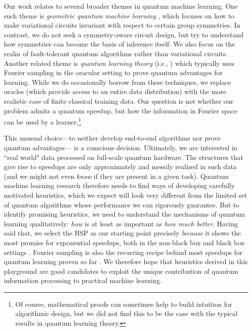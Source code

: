 \documentclass[aps, pre,reprint,nofootinbib,citeautoscript,floatfix]{revtex4-1}
\begin{document}
Our work relates to several 
broader themes in quantum machine learning. One such theme is \textit{geometric quantum machine learning} \cite{Meyer_2023, GIQML, bronstein2021geometric}, which focuses on how to make variational circuits invariant with respect to certain group symmetries. In contrast, we do not seek a symmetry-aware circuit design, but try to understand how symmetries can become the basis of inference itself. We also focus on the realm of fault-tolerant quantum algorithms rather than variational circuits. Another related theme is \textit{quantum learning theory} (i.e., \cite{arunachalam2017survey, caro2023classical, dunjko2017exponential}) which typically uses Fourier sampling in the oracular setting to prove quantum advantages for learning. While we do occasionally borrow from these techniques, we replace oracles (which provide access to an entire data distribution) with the more realistic case of finite classical training data. Our question is not whether our problem admits a quantum speedup, but how the information in Fourier space can be used by a learner.\footnote{Of course, mathematical proofs can sometimes help to build intuition for algorithmic design, but we did not find this to be the case with the typical results in quantum learning theory.}

This unusual choice---to neither develop end-to-end algorithms nor prove quantum advantages--- is a conscious decision. Ultimately, we are interested in ``real world" data processed on full-scale quantum hardware. The structures that give rise to speedups are only approximately and messily realized in such data (and we might not even \textit{know} if they are present in a given task). Quantum machine learning research therefore needs to find ways of developing carefully motivated heuristics, which we expect will look very different from the limited set of quantum algorithms whose performance we can rigorously guarantee. But to identify promising heuristics, we need to understand the mechanisms of quantum learning qualitatively: \textit{how} is 
at least as important as
\textit{how much better}. Having said that, we select the HSP as our starting point precisely \textit{because} it shows the most promise for exponential speedups, both in the non-black box \cite{shor} and black box settings \cite{aaronson2009bqp, aaronson2014forrelation}. Fourier sampling is also the recurring recipe behind most speedups for quantum learning proven so far \cite{caro2023classical, dunjko2017exponential, Liu_2021}. We therefore hope that heuristics derived in this playground are good candidates to exploit the unique contribution of quantum information processing to practical machine learning.
\end{document}
